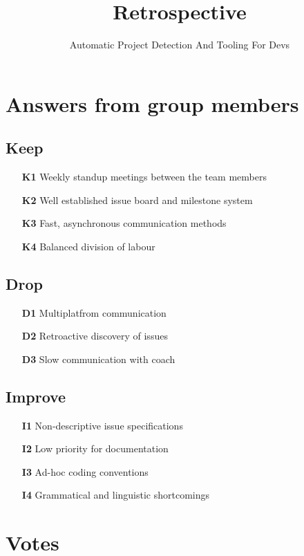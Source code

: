 \documentclass{article}
\title{Retrospective}
\author{Automatic Project Detection And Tooling For Devs}
\date{}
\begin{document}
\maketitle

\section*{Answers from group members} %

\subsection*{Keep}
\begin{itemize}
  \item[\textbf{K1}] Weekly standup meetings between the team members
  \item[\textbf{K2}] Well established issue board and milestone system
  \item[\textbf{K3}] Fast, asynchronous communication methods
  \item[\textbf{K4}] Balanced division of labour
\end{itemize}

\subsection*{Drop}
\begin{itemize}
  \item[\textbf{D1}] Multiplatfrom communication
  \item[\textbf{D2}] Retroactive discovery of issues
  \item[\textbf{D3}] Slow communication with coach
\end{itemize}

\subsection*{Improve}
\begin{itemize}
  \item[\textbf{I1}] Non-descriptive issue specifications
  \item[\textbf{I2}] Low priority for documentation
  \item[\textbf{I3}] Ad-hoc coding conventions
  \item[\textbf{I4}] Grammatical and linguistic shortcomings
\end{itemize}

\newpage
\section*{Votes}
\end{document}
